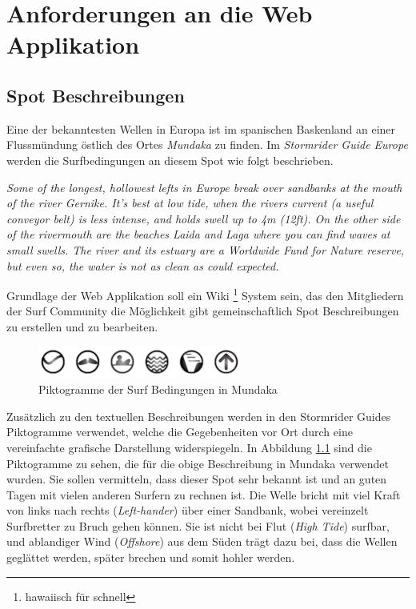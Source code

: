
\chapter{Anforderungen an die Web Applikation}

\section{Spot Beschreibungen}

Eine der bekanntesten Wellen in Europa ist im spanischen Baskenland an
einer Fluss\-mündung östlich des Ortes \textit{Mundaka} zu finden. Im
\textit{Stormrider Guide Europe} werden die Surfbedingungen an diesem
Spot wie folgt beschrieben.

\textit{Some of the longest, hollowest lefts in Europe break over
  sandbanks at the mouth of the river Gernike. It's best at low tide,
  when the rivers current (a useful conveyor belt) is less intense,
  and holds swell up to 4m (12ft). On the other side of the rivermouth
  are the beaches Laida and Laga where you can find waves at small
  swells. The river and its estuary are a Worldwide Fund for Nature
  reserve, but even so, the water is not as clean as could expected.
} \cite[S.180]{storm_europe_1998}

Grundlage der Web Applikation soll ein Wiki \footnote{hawaiisch für
  schnell} System sein, das den Mitgliedern der Surf Community die
Möglichkeit gibt gemeinschaftlich Spot Beschreibungen zu erstellen und
zu bearbeiten.

\begin{figure}[h]
  \begin{center}
    \includegraphics[height=40px]{bilder/mundaka-conditions}
    \caption{Piktogramme der Surf Bedingungen in Mundaka}
    \label{piktogramm}
  \end{center}
\end{figure}

Zusätzlich zu den textuellen Beschreibungen werden in den Stormrider
Guides Piktogramme verwendet, welche die Gegebenheiten vor Ort durch
eine vereinfachte grafische Darstellung widerspiegeln. In Abbildung
\ref{piktogramm} sind die Piktogramme zu sehen, die für die obige
Beschreibung in Mundaka verwendet wurden. Sie sollen vermitteln, dass
dieser Spot sehr bekannt ist und an guten Tagen mit vielen anderen
Surfern zu rechnen ist. Die Welle bricht mit viel Kraft von links nach
rechts (\textit{Left-hander}) über einer Sandbank, wobei vereinzelt
Surfbretter zu Bruch gehen können.  Sie ist nicht bei Flut
(\textit{High Tide}) surfbar, und ablandiger Wind (\textit{Offshore})
aus dem Süden trägt dazu bei, dass die Wellen geglättet werden, später
brechen und somit hohler werden.

